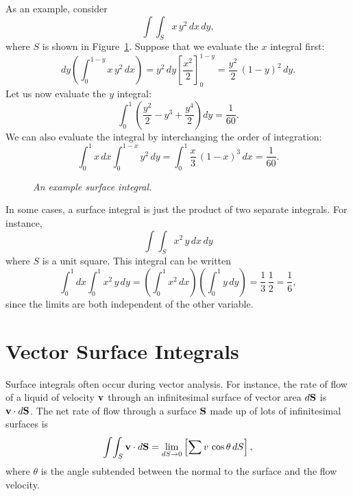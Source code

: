 As an example, consider 
\begin{equation}
\int\!\int_S x \,y^2\,dx\,dy,
\end{equation}
where $S$ is shown in Figure~\ref{f14}.
Suppose that we evaluate the $x$ integral  first:
\begin{equation}
dy\left(\int_0^{1-y} x\, y^2\,dx\right) = y^2\,dy\left[ \frac{x^2}{2}\right]^{1-y}_0
= \frac{y^2}{2}\,(1-y)^2\,dy.
\end{equation}
Let us now evaluate the $y$ integral:
\begin{equation}
\int_0^1 \left(\frac{y^2}{2}-y^3+ \frac{y^4}{2}\right)dy = \frac{1}{60}.
\end{equation}
We can also evaluate the integral by interchanging the order of integration:
\begin{equation}
\int_0^1 x\,dx \int_0^{1-x} y^2\,dy = \int_0^1\frac{x}{3}\, (1-x)^3\,dx
 = \frac{1}{60}.
\end{equation}
\begin{figure}
\centerline{}
\caption{\em An example surface integral.}\label{f14}
\end{figure}

In some cases, a surface integral is just the product of two separate integrals.
For instance, 
\begin{equation}
\int\int_S x^2 \,y\,dx\,dy
\end{equation}
where $S$ is a unit square. This integral can be written
\begin{equation}
\int_0^1 dx \int_0^1 x^2 \,y\,dy = \left(\int_0^1 x^2\,dx\right)
\left(\int_0^1 y \,dy\right) = \frac{1}{3}\,\frac{1}{2} = \frac{1}{6},
\end{equation}
since the limits are both independent of the other variable. 

\section{Vector Surface Integrals}
Surface integrals often occur during vector analysis. For instance, the rate of
flow of a liquid of velocity ${\bf v}$ through an infinitesimal
 surface of vector area $d{\bf S}$
is ${\bf v} \cdot d{\bf S}$. The net rate of flow through a surface ${\bf S}$ made up
of
lots of infinitesimal surfaces is 
\begin{equation}
\int\!\int_S {\bf v}\cdot d{\bf S} = \lim_{dS\rightarrow 0}\left[ \sum v\,\cos\theta
\,dS\right],
\end{equation}
where $\theta$ is the angle subtended between the normal to the surface and the
flow velocity. 

